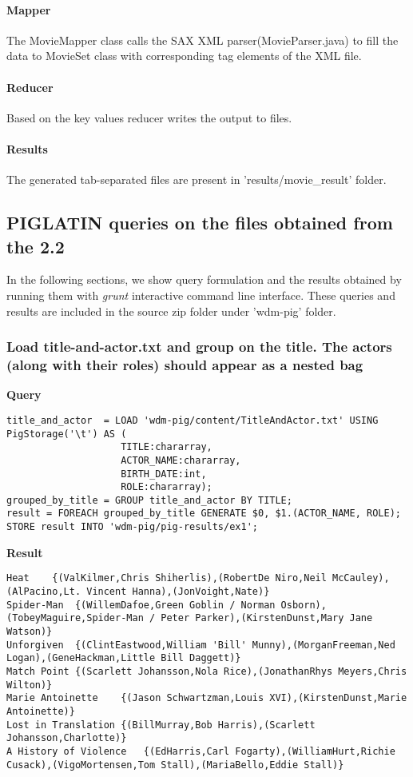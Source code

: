 \documentclass[a4paper,10pt]{article}
\begin{document}
\paragraph{Mapper}
The MovieMapper class calls the SAX XML parser(MovieParser.java) to fill the data to MovieSet class with corresponding tag elements of the XML file.

\paragraph{Reducer}
Based on the key values reducer writes the output to files.

\paragraph{Results}
The generated tab-separated files are present in 'results/movie_result' folder.

\subsection{PIGLATIN queries on the files obtained from the 2.2}
\lstset{language=bash}
In the following sections, we show query formulation and the results obtained by running them with \emph{grunt} interactive command line interface. These queries and results are included in the source zip folder under 'wdm-pig' folder.
\subsubsection{Load title-and-actor.txt and group on the title. The actors (along with their roles)
should appear as a nested bag}
\textbf{Query}
\begin{lstlisting}
title_and_actor  = LOAD 'wdm-pig/content/TitleAndActor.txt' USING PigStorage('\t') AS ( 
                    TITLE:chararray,
                    ACTOR_NAME:chararray,
                    BIRTH_DATE:int,
                    ROLE:chararray);
grouped_by_title = GROUP title_and_actor BY TITLE;
result = FOREACH grouped_by_title GENERATE $0, $1.(ACTOR_NAME, ROLE);
STORE result INTO 'wdm-pig/pig-results/ex1';
\end{lstlisting}

\textbf{Result}

\begin{lstlisting}
Heat	{(ValKilmer,Chris Shiherlis),(RobertDe Niro,Neil McCauley),(AlPacino,Lt. Vincent Hanna),(JonVoight,Nate)}
Spider-Man	{(WillemDafoe,Green Goblin / Norman Osborn),(TobeyMaguire,Spider-Man / Peter Parker),(KirstenDunst,Mary Jane Watson)}
Unforgiven	{(ClintEastwood,William 'Bill' Munny),(MorganFreeman,Ned Logan),(GeneHackman,Little Bill Daggett)}
Match Point	{(Scarlett Johansson,Nola Rice),(JonathanRhys Meyers,Chris Wilton)}
Marie Antoinette	{(Jason Schwartzman,Louis XVI),(KirstenDunst,Marie Antoinette)}
Lost in Translation	{(BillMurray,Bob Harris),(Scarlett Johansson,Charlotte)}
A History of Violence	{(EdHarris,Carl Fogarty),(WilliamHurt,Richie Cusack),(VigoMortensen,Tom Stall),(MariaBello,Eddie Stall)}
\end{lstlisting}
\end{document}
